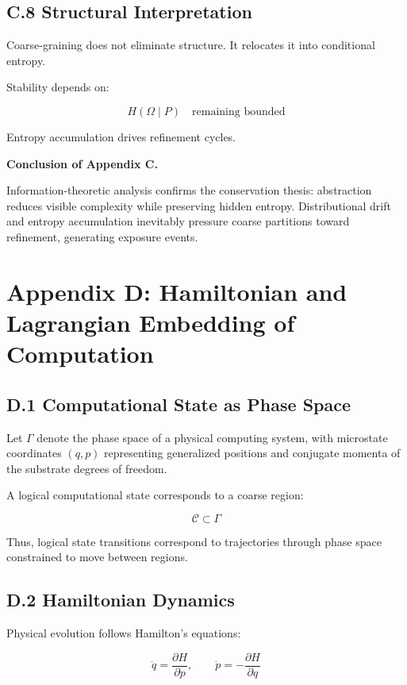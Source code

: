 \documentclass[11pt,openany]{book}
\begin{document}
\subsection{C.8 Structural Interpretation}

Coarse-graining does not eliminate structure.
It relocates it into conditional entropy.

Stability depends on:

\[
H(\Omega \mid P)
\quad \text{remaining bounded}
\]

Entropy accumulation drives refinement cycles.

\bigskip

\textbf{Conclusion of Appendix C.}

Information-theoretic analysis confirms the conservation thesis:
abstraction reduces visible complexity while preserving hidden entropy.
Distributional drift and entropy accumulation inevitably pressure 
coarse partitions toward refinement, generating exposure events.

\section{Appendix D: Hamiltonian and Lagrangian Embedding of Computation}

\subsection{D.1 Computational State as Phase Space}

Let $\Gamma$ denote the phase space of a physical computing system, 
with microstate coordinates $(q,p)$ representing generalized positions 
and conjugate momenta of the substrate degrees of freedom.

A logical computational state corresponds to a coarse region:

\[
\mathcal{C} \subset \Gamma
\]

Thus, logical state transitions correspond to trajectories 
through phase space constrained to move between regions.

\subsection{D.2 Hamiltonian Dynamics}

Physical evolution follows Hamilton's equations:

\[
\dot{q} = \frac{\partial H}{\partial p},
\qquad
\dot{p} = -\frac{\partial H}{\partial q}
\]
\end{document}
